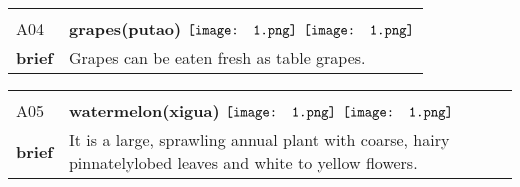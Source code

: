 \documentclass[UTF8]{article}
\begin{document}
            \begin{tabularx}{\textwidth}{p{1.5cm}X}
            \arrayrulecolor{myBlue}
        	\hline\\
            \small{A04}&
            \large{\bfseries{grapes(putao)}}\hfill
                                                            $\vcenter{\hbox{\texttt{[image: 1.png]}}}$
                                                                \phantom{$\vcenter{\hbox{\texttt{[image: 1.png]}}}$}
                                                                \phantom{$\vcenter{\hbox{\texttt{[image: 1.png]}}}$}
                                                                \phantom{$\vcenter{\hbox{\texttt{[image: 1.png]}}}$}
                                                                \phantom{$\vcenter{\hbox{\texttt{[image: 1.png]}}}$}
                                                                $\vcenter{\hbox{\texttt{[image: 1.png]}}}$
                                                                \phantom{$\vcenter{\hbox{\texttt{[image: 1.png]}}}$}
                                        \\[10pt]
            \large{\bfseries{brief}}&\noindent\parbox[c]{\hsize}{Grapes can be eaten fresh as table grapes. } \\[5pt]
            \hline\\[-10pt]
        \end{tabularx}
            \begin{tabularx}{\textwidth}{p{1.5cm}X}
            \arrayrulecolor{myBlue}
        	\hline\\
            \small{A05}&
            \large{\bfseries{watermelon(xigua)}}\hfill
                                                            $\vcenter{\hbox{\texttt{[image: 1.png]}}}$
                                                                \phantom{$\vcenter{\hbox{\texttt{[image: 1.png]}}}$}
                                                                \phantom{$\vcenter{\hbox{\texttt{[image: 1.png]}}}$}
                                                                $\vcenter{\hbox{\texttt{[image: 1.png]}}}$
                                                                \phantom{$\vcenter{\hbox{\texttt{[image: 1.png]}}}$}
                                                                \phantom{$\vcenter{\hbox{\texttt{[image: 1.png]}}}$}
                                                                \phantom{$\vcenter{\hbox{\texttt{[image: 1.png]}}}$}
                                        \\[10pt]
            \large{\bfseries{brief}}&\noindent\parbox[c]{\hsize}{It is a large, sprawling annual plant with coarse, hairy pinnatelylobed leaves and white to yellow flowers.} \\[5pt]
            \hline\\[-10pt]
        \end{tabularx}
\end{document}
